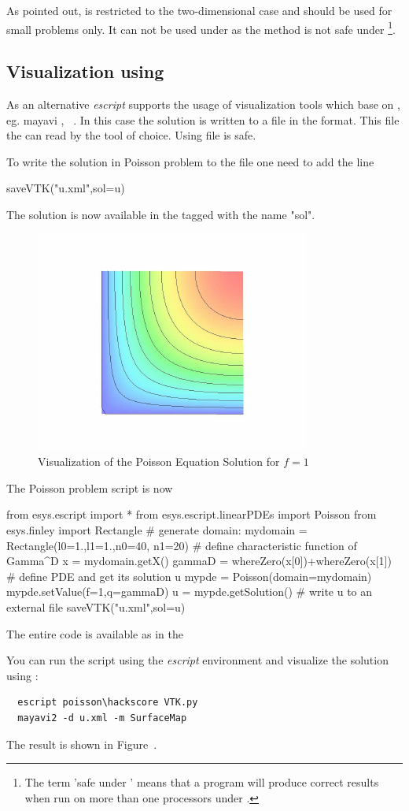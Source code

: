 As pointed out, \MATPLOTLIB is restricted to the two-dimensional case and 
should be used for small problems only. It can not be used under \MPI as the  method is
not safe under \MPI\footnote{The term 'safe under \MPI' means that a program will produce correct results when run on more than one processors under \MPI.}.

\subsection{Visualization using \VTK}

As an alternative {\it escript} supports the usage of visualization tools which base on \VTK, eg. mayavi \cite{mayavi}, \VisIt~\cite{VisIt}. In this case the solution is written to a file in the \VTK format. This file the can read by the tool of choice. Using \VTK file is \MPI safe.

To write the solution  in  Poisson problem to the file  one need to add the line
\begin{python}
saveVTK("u.xml",sol=u)
\end{python}
The solution  is now available in the  tagged with the name "sol". 

\begin{figure}
\centerline{\includegraphics[width=\figwidth]{figures/FirstStepResult}}
\caption{Visualization of the Poisson Equation Solution for $f=1$}
\label{fig:FirstSteps.3}
\end{figure}

The Poisson problem script is now 
\begin{python}
  from esys.escript import *
  from esys.escript.linearPDEs import Poisson
  from esys.finley import Rectangle
  # generate domain:
  mydomain = Rectangle(l0=1.,l1=1.,n0=40, n1=20)
  # define characteristic function of Gamma^D
  x = mydomain.getX()
  gammaD = whereZero(x[0])+whereZero(x[1])
  # define PDE and get its solution u
  mypde = Poisson(domain=mydomain)
  mypde.setValue(f=1,q=gammaD)
  u = mypde.getSolution()
  # write u to an external file
  saveVTK("u.xml",sol=u)
\end{python}
The entire code is available as  in the \ExampleDirectory

You can run the script using the {\it escript} environment
and visualize the solution using \mayavi:
\begin{verbatim}
  escript poisson\hackscore VTK.py
  mayavi2 -d u.xml -m SurfaceMap
\end{verbatim}
The result is shown in Figure~. 

